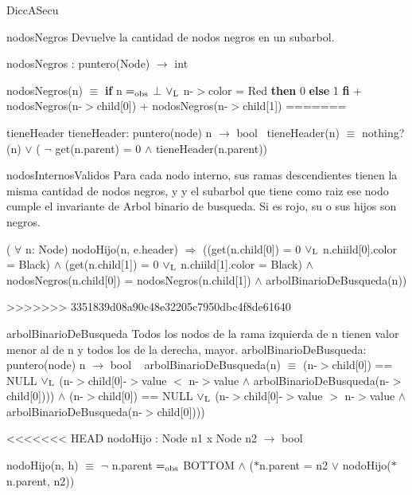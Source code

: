 \begin{DoxyParagraph}{\-Dicc\-A\-Secu}
\begin{DoxyParagraph}{nodos\-Negros}
\-Devuelve la cantidad de nodos negros en un subarbol.
\end{DoxyParagraph}
nodos\-Negros \-: puntero(\-Node) $\to$ int\par
 nodos\-Negros(n) $\equiv$ {\bfseries if} n $=_{\rm obs}$ $\bot$ $\lor_{\rm L}$ n-\/$>$color = \-Red {\bfseries then} 0 {\bfseries else} 1 {\bfseries fi} + nodos\-Negros(n-\/$>$child\mbox{[}0\mbox{]}) + nodos\-Negros(n-\/$>$child\mbox{[}1\mbox{]}) 
=======


\begin{DoxyParagraph}{tiene\+Header}
tiene\+Header\+: puntero(node) n $\to$ bool~\newline
tiene\+Header(n) $\equiv$ nothing?(n) $\lor$ ( $\lnot$ get(n.\+parent) = 0 $\land$ tiene\+Header(n.\+parent)) 
\end{DoxyParagraph}


\begin{DoxyParagraph}{nodos\+Internos\+Validos}
Para cada nodo interno, sus ramas descendientes tienen la misma cantidad de nodos negros, y y el subarbol que tiene como raiz ese nodo cumple el invariante de Arbol binario de busqueda. Si es rojo, su o sus hijos son negros.

( $\forall$ n\+: Node) nodo\+Hijo(n, e.\+header) $\Rightarrow$ ((get(n.\+child\mbox{[}0\mbox{]}) = 0 $\lor_{\rm L}$ n.\+chiild\mbox{[}0\mbox{]}.color = Black) $\land$ (get(n.\+child\mbox{[}1\mbox{]}) = 0 $\lor_{\rm L}$ n.\+chiild\mbox{[}1\mbox{]}.color = Black) $\land$ nodos\+Negros(n.\+child\mbox{[}0\mbox{]}) = nodos\+Negros(n.\+child\mbox{[}1\mbox{]}) $\land$ arbol\+Binario\+De\+Busqueda(n)) 
\end{DoxyParagraph}

>>>>>>> 3351839d08a90c48e32205c7950dbc4f8de61640

\begin{DoxyParagraph}{arbol\+Binario\+De\+Busqueda}
Todos los nodos de la rama izquierda de n tienen valor menor al de n y todos los de la derecha, mayor. arbol\+Binario\+De\+Busqueda\+: puntero(node) n $\to$ bool ~\newline
arbol\+Binario\+De\+Busqueda(n) $\equiv$ (n-\/$>$child\mbox{[}0\mbox{]}) == N\+U\+LL $\lor_{\rm L}$ (n-\/$>$child\mbox{[}0\mbox{]}-\/$>$value $<$ n-\/$>$value $\land$ arbol\+Binario\+De\+Busqueda(n-\/$>$child\mbox{[}0\mbox{]}))) $\land$ (n-\/$>$child\mbox{[}0\mbox{]}) == N\+U\+LL $\lor_{\rm L}$ (n-\/$>$child\mbox{[}0\mbox{]}-\/$>$value $>$ n-\/$>$value $\land$ arbol\+Binario\+De\+Busqueda(n-\/$>$child\mbox{[}0\mbox{]}))) 
\end{DoxyParagraph}
<<<<<<< HEAD
nodo\-Hijo \-: \-Node n1 x \-Node n2 $\to$ bool\par
 nodo\-Hijo(n, h) $\equiv$ $\lnot$ n.\-parent $=_{\rm obs}$ \-B\-O\-T\-T\-O\-M $\land$ ($\ast$n.parent = n2 $\lor$ nodo\-Hijo($\ast$n.parent, n2)) 


\end{DoxyParagraph}
